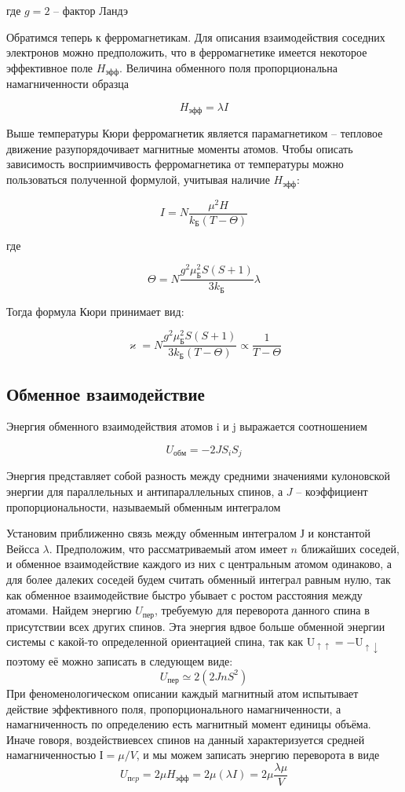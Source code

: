 \documentclass[a4paper,12pt]{article}
\begin{document}
где $g = 2$ -- фактор Ландэ

Обратимся теперь к ферромагнетикам. Для описания взаимодействия соседних электронов можно предположить, что в ферромагнетике имеется некоторое эффективное поле $H_{эфф}$. Величина обменного поля пропорциональна намагниченности образца

$$
	H_{эфф} = \lambda I
$$

Выше температуры Кюри ферромагнетик является парамагнетиком -- тепловое движение разупорядочивает магнитные моменты атомов. Чтобы описать зависимость восприимчивость ферромагнетика от температуры можно пользоваться полученной формулой, учитывая наличие $H_{эфф}$:

$$
	I = N \frac{\mu^2 H}{k_Б(T - \Theta)}
$$

где 

$$
	\Theta = N \frac{g^2 \mu_Б^2 S (S + 1)}{3 k_Б} \lambda
$$

Тогда формула Кюри принимает вид:

$$
	\varkappa = N \frac{g^2 \mu_Б^2 S(S+1)}{3 k_Б(T - \Theta)} \propto \frac{1}{T - \Theta}
$$

\subsection*{Обменное взаимодействие}

Энергия обменного взаимодействия атомов i и j выражается соотношением

$$
	U_{обм} = - 2 J S_i S_j
$$

Энергия представляет собой разность между средними значениями кулоновской энергии для параллельных и антипараллельных спинов, а $J$ -- коэффициент пропорциональности, называемый обменным интегралом

Установим приближенно связь между обменным интегралом $Ј$ и константой Вейсса $\lambda$. Предположим, что рассматриваемый атом имеет $n$ ближайших соседей, и обменное
взаимодействие каждого из них с центральным атомом одинаково, а для более далеких соседей будем считать обменный интеграл равным нулю, так как обменное взаимодействие быстро убывает с ростом расстояния между атомами. Найдем энергию $U_\text{пер}$, требуемую
для переворота данного спина в присутствии всех других спинов. Эта энергия вдвое больше обменной энергии системы с какой-то определенной ориентацией спина, так как $\mathrm{U}_{\uparrow \uparrow}=-\mathrm{U}_{\uparrow \downarrow}$ поэтому её можно записать в следующем виде:
$$
U_{пер } \simeq 2\left(2 J n S^{2}\right)
$$
При феноменологическом описании каждый магнитный атом испытывает действие
эффективного поля, пропорционального намагниченности, а намагниченность по
определению есть магнитный момент единицы объёма. Иначе говоря, воздействиевсех спинов на данный характеризуется средней намагниченностью $І=\mu/V$, и мы можем
записать энергию переворота в виде
$$
U_{пep}=2 \mu H_{эфф}=2 \mu(\lambda I)=2 \mu \frac{\lambda \mu}{V}
$$
\end{document}
